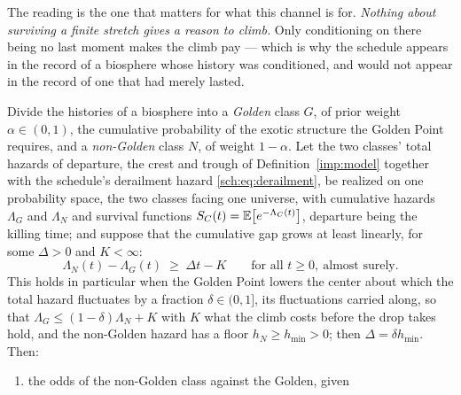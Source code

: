 \begin{remark}
The reading is the one that matters for what this channel is for.
\emph{Nothing about surviving a finite stretch gives a reason to climb.}
Only conditioning on there being no last moment makes the climb pay ---
which is why the schedule appears in the record of a biosphere whose
history was conditioned, and would not appear in the record of one that
had merely lasted.
\end{remark}

\begin{theorem}\label{sch:thm:emergence}
Divide the histories of a biosphere into a \emph{Golden} class $G$, of
prior weight $\alpha\in(0,1)$, the cumulative probability of the exotic
structure the Golden Point requires, and a \emph{non-Golden} class $N$,
of weight $1-\alpha$. Let the two classes' total hazards of departure,
the crest and trough of Definition~\ref{imp:model} together with the
schedule's derailment hazard \eqref{sch:eq:derailment}, be realized on
one probability space, the two classes facing one universe, with
cumulative hazards $\Lambda_G$ and $\Lambda_N$ and survival functions
$S_C(t)=\mathbb{E}\bigl[e^{-\Lambda_C(t)}\bigr]$, departure being the killing
time; and suppose that the cumulative gap grows at least linearly, for
some $\Delta>0$ and $K<\infty$:
\begin{equation}\label{sch:eq:emergencegap}
\Lambda_N(t)-\Lambda_G(t)\;\ge\;\Delta t-K
\qquad\text{for all }t\ge0,\ \text{almost surely}.
\end{equation}
This holds in particular when the Golden Point lowers the center about
which the total hazard fluctuates by a fraction $\delta\in(0,1]$, its
fluctuations carried along, so that $\Lambda_G\le(1-\delta)\Lambda_N+K$
with $K$ what the climb costs before the drop takes hold, and the
non-Golden hazard has a floor $h_N\ge h_{\min}>0$; then
$\Delta=\delta h_{\min}$. Then:
\begin{enumerate}[label=\emph{(\roman*)},itemsep=2pt]
\item the odds of the non-Golden class against the Golden, given

\end{enumerate}
\end{theorem}
